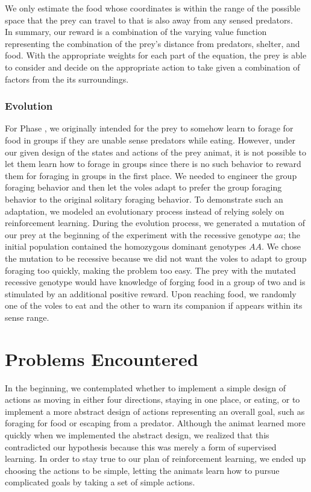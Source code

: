 \documentclass[10pt,conference,letterpaper,doublecolumn]{IEEEtran}
\begin{document}
We only estimate the food whose coordinates is within the range of the possible space that the prey can travel to that is also away from any sensed predators. \\

In summary, our reward is a combination of the varying value function representing the combination of the prey’s distance from predators, shelter, and food. With the appropriate weights for each part of the equation, the prey is able to consider and decide on the appropriate action to take given a combination of factors from the its surroundings.
\subsubsection{Evolution}
For Phase \uppercase\expandafter{}, we originally intended for the prey to somehow learn to forage for food in groups if they are unable sense predators while eating. However, under our given design of the states and actions of the prey animat, it is not possible to let them learn how to forage in groups since there is no such behavior to reward them for foraging in groups in the first place. We needed to engineer the group foraging behavior and then let the voles adapt to prefer the group foraging behavior to the original solitary foraging behavior. To demonstrate such an adaptation, we modeled an evolutionary process instead of relying solely on reinforcement learning. During the evolution process, we generated a mutation of our prey at the beginning of the experiment with the recessive genotype $aa$; the initial population contained the homozygous dominant genotypes $AA$. We chose the mutation to be recessive because we did not want the voles to adapt to group foraging too quickly, making the problem too easy. The prey with the mutated recessive genotype would have knowledge of forging food in a group of two and is stimulated by an additional positive reward. Upon reaching food, we randomly one of the voles to eat and the other to warn its companion if appears within its sense range.

\section{Problems Encountered}
In the beginning, we contemplated whether to implement a simple design of actions as moving in either four directions, staying in one place, or eating, or to implement a more abstract design of actions representing an overall goal, such as foraging for food or escaping from a predator. Although the animat learned more quickly when we implemented the abstract design, we realized that this contradicted our hypothesis because this was merely a form of supervised learning. In order to stay true to our plan of reinforcement learning, we ended up choosing the actions to be simple, letting the animats learn how to pursue complicated goals by taking a set of simple actions. \\
\end{document}
